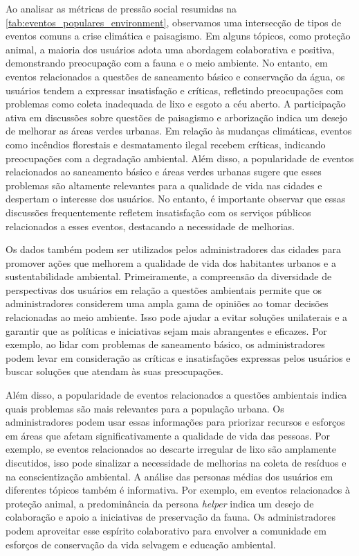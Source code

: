 Ao analisar as métricas de pressão social resumidas na \autoref{tab:eventos_populares_environment}, observamos uma intersecção de tipos de eventos comuns a crise climática e paisagismo. Em alguns tópicos, como proteção animal, a maioria dos usuários adota uma abordagem colaborativa e positiva, demonstrando preocupação com a fauna e o meio ambiente. No entanto, em eventos relacionados a questões de saneamento básico e conservação da água, os usuários tendem a expressar insatisfação e críticas, refletindo preocupações com problemas como coleta inadequada de lixo e esgoto a céu aberto. A participação ativa em discussões sobre questões de paisagismo e arborização indica um desejo de melhorar as áreas verdes urbanas. Em relação às mudanças climáticas, eventos como incêndios florestais e desmatamento ilegal recebem críticas, indicando preocupações com a degradação ambiental. Além disso, a popularidade de eventos relacionados ao saneamento básico e áreas verdes urbanas sugere que esses problemas são altamente relevantes para a qualidade de vida nas cidades e despertam o interesse dos usuários. No entanto, é importante observar que essas discussões frequentemente refletem insatisfação com os serviços públicos relacionados a esses eventos, destacando a necessidade de melhorias.

Os dados também podem ser utilizados pelos administradores das cidades para promover ações que melhorem a qualidade de vida dos habitantes urbanos e a sustentabilidade ambiental. Primeiramente, a compreensão da diversidade de perspectivas dos usuários em relação a questões ambientais permite que os administradores considerem uma ampla gama de opiniões ao tomar decisões relacionadas ao meio ambiente. Isso pode ajudar a evitar soluções unilaterais e a garantir que as políticas e iniciativas sejam mais abrangentes e eficazes. Por exemplo, ao lidar com problemas de saneamento básico, os administradores podem levar em consideração as críticas e insatisfações expressas pelos usuários e buscar soluções que atendam às suas preocupações.

Além disso, a popularidade de eventos relacionados a questões ambientais indica quais problemas são mais relevantes para a população urbana. Os administradores podem usar essas informações para priorizar recursos e esforços em áreas que afetam significativamente a qualidade de vida das pessoas. Por exemplo, se eventos relacionados ao descarte irregular de lixo são amplamente discutidos, isso pode sinalizar a necessidade de melhorias na coleta de resíduos e na conscientização ambiental. A análise das personas médias dos usuários em diferentes tópicos também é informativa. Por exemplo, em eventos relacionados à proteção animal, a predominância da persona \textit{helper} indica um desejo de colaboração e apoio a iniciativas de preservação da fauna. Os administradores podem aproveitar esse espírito colaborativo para envolver a comunidade em esforços de conservação da vida selvagem e educação ambiental.

